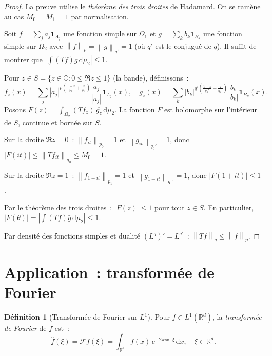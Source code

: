 \documentclass[a4paper,12pt]{book}
\newcommand{\R}{\mathbb{R}}
\newcommand{\C}{\mathbb{C}}
\newcommand{\dd}{\mathrm{d}}
\newcommand{\norm}[1]{\left\| #1 \right\|}
\newcommand{\abs}[1]{\left| #1 \right|}
\theoremstyle{definition}
\newtheorem{definition}{Définition}[chapter]
\theoremstyle{plain}
\theoremstyle{remark}
\begin{document}
\begin{proof}
La preuve utilise le \emph{théorème des trois droites}
de Hadamard. On se ramène au cas $M_0 = M_1 = 1$ par normalisation.

Soit $f = \sum_{j} a_j \mathbf{1}_{A_j}$ une fonction simple sur $\Omega_1$ et
$g = \sum_{k} b_k \mathbf{1}_{B_k}$ une fonction simple sur $\Omega_2$ avec
$\norm{f}_p = \norm{g}_{q'} = 1$ (où $q'$ est le conjugué de $q$). Il suffit de montrer
que $\abs{\int (Tf)\bar g\,\dd\mu_2} \le 1$.

Pour $z \in S = \{z \in \C : 0 \le \Re z \le 1\}$ (la bande), définissons~:
\[
  f_z(x) = \sum_j \abs{a_j}^{p(\frac{1-z}{p_0} + \frac{z}{p_1})}
    \frac{a_j}{\abs{a_j}} \mathbf{1}_{A_j}(x), \quad
  g_z(x) = \sum_k \abs{b_k}^{q'(\frac{1-z}{q_0'} + \frac{z}{q_1'})}
    \frac{b_k}{\abs{b_k}} \mathbf{1}_{B_k}(x).
\]
Posons $F(z) = \int_{\Omega_2} (Tf_z)\,\overline{g_z}\,\dd\mu_2$. La fonction $F$ est
holomorphe sur l'intérieur de $S$, continue et bornée sur $S$.

Sur la droite $\Re z = 0$~: $\norm{f_{it}}_{p_0} = 1$ et $\norm{g_{it}}_{q_0'} = 1$,
donc $\abs{F(it)} \le \norm{Tf_{it}}_{q_0} \le M_0 = 1$.

Sur la droite $\Re z = 1$~: $\norm{f_{1+it}}_{p_1} = 1$ et $\norm{g_{1+it}}_{q_1'} = 1$,
donc $\abs{F(1+it)} \le 1$.

Par le théorème des trois droites~: $\abs{F(z)} \le 1$ pour tout $z \in S$. En
particulier, $\abs{F(\theta)} = \abs{\int (Tf)\bar g\,\dd\mu_2} \le 1$.

Par densité des fonctions simples et dualité $(L^q)' = L^{q'}$~:
$\norm{Tf}_q \le \norm{f}_p$.
\end{proof}

\section{Application~: transformée de Fourier}

\begin{definition}[Transformée de Fourier sur $L^1$]
\label{def:fourier-L1}
Pour $f \in L^1(\R^d)$, la \emph{transformée de Fourier} de $f$ est~:
\[
  \hat f(\xi) = \mathcal{F}f(\xi) = \int_{\R^d} f(x)\, e^{-2\pi i x \cdot \xi}\,\dd x,
  \quad \xi \in \R^d.
\]
\end{definition}
\end{document}
